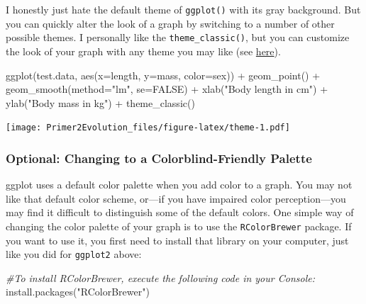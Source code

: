 \documentclass[
]{book}
\newenvironment{Shaded}{\begin{snugshade}}{\end{snugshade}}
\newcommand{\AttributeTok}[1]{\textcolor[rgb]{0.77,0.63,0.00}{#1}}
\newcommand{\CommentTok}[1]{\textcolor[rgb]{0.56,0.35,0.01}{\textit{#1}}}
\newcommand{\ConstantTok}[1]{\textcolor[rgb]{0.00,0.00,0.00}{#1}}
\newcommand{\FunctionTok}[1]{\textcolor[rgb]{0.00,0.00,0.00}{#1}}
\newcommand{\NormalTok}[1]{#1}
\newcommand{\SpecialCharTok}[1]{\textcolor[rgb]{0.00,0.00,0.00}{#1}}
\newcommand{\StringTok}[1]{\textcolor[rgb]{0.31,0.60,0.02}{#1}}
\begin{document}
I honestly just hate the default theme of \texttt{ggplot()} with its gray background. But you can quickly alter the look of a graph by switching to a number of other possible themes. I personally like the \texttt{theme\_classic()}, but you can customize the look of your graph with any theme you may like (see \href{https://www.datanovia.com/en/blog/ggplot-themes-gallery/\#basic-ggplot}{here}).

\begin{Shaded}
\begin{Highlighting}[]
\FunctionTok{ggplot}\NormalTok{(test.data, }\FunctionTok{aes}\NormalTok{(}\AttributeTok{x=}\NormalTok{length, }\AttributeTok{y=}\NormalTok{mass, }\AttributeTok{color=}\NormalTok{sex)) }\SpecialCharTok{+}
  \FunctionTok{geom\_point}\NormalTok{() }\SpecialCharTok{+}
  \FunctionTok{geom\_smooth}\NormalTok{(}\AttributeTok{method=}\StringTok{"lm"}\NormalTok{, }\AttributeTok{se=}\ConstantTok{FALSE}\NormalTok{) }\SpecialCharTok{+}
  \FunctionTok{xlab}\NormalTok{(}\StringTok{"Body length in cm"}\NormalTok{) }\SpecialCharTok{+}
  \FunctionTok{ylab}\NormalTok{(}\StringTok{"Body mass in kg"}\NormalTok{) }\SpecialCharTok{+}
  \FunctionTok{theme\_classic}\NormalTok{()}
\end{Highlighting}
\end{Shaded}

\texttt{[image: Primer2Evolution\_files/figure-latex/theme-1.pdf]}

\hypertarget{optional-changing-to-a-colorblind-friendly-palette}{%
\subsubsection*{Optional: Changing to a Colorblind-Friendly Palette}\label{optional-changing-to-a-colorblind-friendly-palette}}

ggplot uses a default color palette when you add color to a graph. You may not like that default color scheme, or---if you have impaired color perception---you may find it difficult to distinguish some of the default colors. One simple way of changing the color palette of your graph is to use the \texttt{RColorBrewer} package. If you want to use it, you first need to install that library on your computer, just like you did for \texttt{ggplot2} above:

\begin{Shaded}
\begin{Highlighting}[]
\CommentTok{\#To install RColorBrewer, execute the following code in your Console:}
\NormalTok{install}\AttributeTok{.packages}\NormalTok{(}\StringTok{"RColorBrewer"}\NormalTok{)}
\end{Highlighting}
\end{Shaded}
\end{document}
